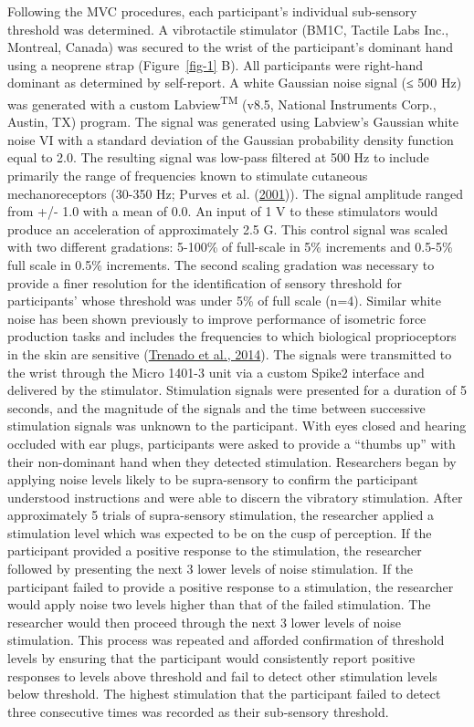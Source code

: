 \documentclass[]{cik}%
\begin{document}
Following the MVC procedures, each participant's individual sub-sensory
threshold was determined. A vibrotactile stimulator (BM1C, Tactile Labs
Inc., Montreal, Canada) was secured to the wrist of the participant's
dominant hand using a neoprene strap (Figure~\ref{fig-1} B). All
participants were right-hand dominant as determined by self-report. A
white Gaussian noise signal (≤ 500 Hz) was generated with a custom
Labview\textsuperscript{TM} (v8.5, National Instruments Corp., Austin,
TX) program. The signal was generated using Labview's Gaussian white
noise VI with a standard deviation of the Gaussian probability density
function equal to 2.0. The resulting signal was low-pass filtered at 500
Hz to include primarily the range of frequencies known to stimulate
cutaneous mechanoreceptors (30-350 Hz; Purves et al.
(\protect\hyperlink{ref-purves2001}{2001})). The signal amplitude ranged
from +/- 1.0 with a mean of 0.0. An input of 1 V to these stimulators
would produce an acceleration of approximately 2.5 G. This control
signal was scaled with two different gradations: 5-100\% of full-scale
in 5\% increments and 0.5-5\% full scale in 0.5\% increments. The second
scaling gradation was necessary to provide a finer resolution for the
identification of sensory threshold for participants' whose threshold
was under 5\% of full scale (n=4). Similar white noise has been shown
previously to improve performance of isometric force production tasks
and includes the frequencies to which biological proprioceptors in the
skin are sensitive (\protect\hyperlink{ref-Trenado2014}{Trenado et al.,
2014}). The signals were transmitted to the wrist through the Micro
1401-3 unit via a custom Spike2 interface and delivered by the
stimulator. Stimulation signals were presented for a duration of 5
seconds, and the magnitude of the signals and the time between
successive stimulation signals was unknown to the participant. With eyes
closed and hearing occluded with ear plugs, participants were asked to
provide a ``thumbs up'' with their non-dominant hand when they detected
stimulation. Researchers began by applying noise levels likely to be
supra-sensory to confirm the participant understood instructions and
were able to discern the vibratory stimulation. After approximately 5
trials of supra-sensory stimulation, the researcher applied a
stimulation level which was expected to be on the cusp of perception. If
the participant provided a positive response to the stimulation, the
researcher followed by presenting the next 3 lower levels of noise
stimulation. If the participant failed to provide a positive response to
a stimulation, the researcher would apply noise two levels higher than
that of the failed stimulation. The researcher would then proceed
through the next 3 lower levels of noise stimulation. This process was
repeated and afforded confirmation of threshold levels by ensuring that
the participant would consistently report positive responses to levels
above threshold and fail to detect other stimulation levels below
threshold. The highest stimulation that the participant failed to detect
three consecutive times was recorded as their sub-sensory threshold.
\end{document}
